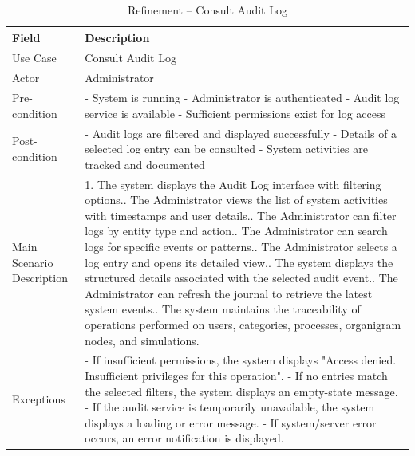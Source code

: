 \begin{table}[H]
\centering
\caption{Refinement -- Consult Audit Log}
\label{tab:raffinement-audit}
\begin{tabular}{|p{3cm}|p{12cm}|}
\hline
\textbf{Field} & \textbf{Description} \\
\hline
Use Case & Consult Audit Log \\
\hline
Actor & Administrator \\
\hline
Pre-condition & 
- System is running\newline
- Administrator is authenticated\newline
- Audit log service is available\newline
- Sufficient permissions exist for log access \\
\hline
Post-condition & 
- Audit logs are filtered and displayed successfully\newline
- Details of a selected log entry can be consulted\newline
- System activities are tracked and documented \\
\hline
Main Scenario Description & 
1. The system displays the Audit Log interface with filtering options.\newline
2. The Administrator views the list of system activities with timestamps and user details.\newline
3. The Administrator can filter logs by entity type and action.\newline
4. The Administrator can search logs for specific events or patterns.\newline
5. The Administrator selects a log entry and opens its detailed view.\newline
6. The system displays the structured details associated with the selected audit event.\newline
7. The Administrator can refresh the journal to retrieve the latest system events.\newline
8. The system maintains the traceability of operations performed on users, categories, processes, organigram nodes, and simulations. \\
\hline
Exceptions & 
- If insufficient permissions, the system displays "Access denied. Insufficient privileges for this operation".\newline
- If no entries match the selected filters, the system displays an empty-state message.\newline
- If the audit service is temporarily unavailable, the system displays a loading or error message.\newline
- If system/server error occurs, an error notification is displayed. \\
\hline
\end{tabular}
\end{table}

